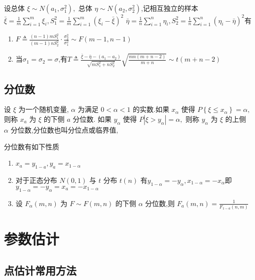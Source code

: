 \documentclass[10pt]{yerbaformat}
\begin{document}
\begin{theorem}
    设总体 $\xi \sim N\left(a_{1}, \sigma_{1}^{2}\right),$ 总体 $\eta \sim N\left(a_{2}, \sigma_{2}^{2}\right)$,记相互独立的样本$\bar{\xi}=\frac{1}{m} \sum_{i=1}^{m} \xi_{i}, S_{1}^{2}=\frac{1}{m} \sum_{i=1}^{m}\left(\xi_{i}-\bar{\xi}\right)^{2}$
    $\bar{\eta}=\frac{1}{n} \sum_{i=1}^{n} \eta_{i}, S_{2}^{2}=\frac{1}{n} \sum_{i=1}^{n}\left(\eta_{i}-\bar{\eta}\right)^{2}$有
    \begin{enumerate}
        \item $F \triangleq \frac{(n-1) m S_{1}^{2}}{(m-1) n S_{2}^{2}} \cdot \frac{\sigma_{2}^{2}}{\sigma_{1}^{2}} \sim F(m-1, n-1)$
        \item 当$\sigma_{1}=\sigma_{2}=\sigma$,有$T \triangleq \frac{\bar{\xi}-\bar{\eta}-\left(a_{1}-a_{2}\right)}{\sqrt{m S_{1}^{2}+n S_{2}^{2}}} \sqrt{\frac{m n(m+n-2)}{m+n}} \sim t(m+n-2)$
    \end{enumerate}
\end{theorem}


\subsection{分位数}
\begin{definition}
    设 $\xi$ 为一个随机变量, $\alpha$ 为满足 $0<\alpha<1$ 的实数.如果 $x_{\alpha}$ 使得 $P\left\{\xi \leqslant x_{\alpha}\right\}=\alpha,$ 则称 $x_{a}$ 为 $\xi$ 的下侧 $a$ 分位数. 如果 $y_{\alpha}$ 使得 $P\left|\xi>y_{\alpha}\right|=\alpha,$ 则称 $y_{\alpha}$ 为 $\xi$ 的上侧 $\alpha$ 分位数,分位数也叫分位点或临界值,
\end{definition}
\par 分位数有如下性质
\begin{enumerate}
    \item $x_{a}=y_{1-a}, y_{a}=x_{1-\alpha}$
    \item 对于正态分布 $N(0,1)$ 与 $t$ 分布 $t(n)$ 有$y_{1-\alpha}=-y_{\alpha}, x_{1-\alpha}=-x_{\alpha}
          $即$y_{1-\alpha}=-y_{\alpha}=x_{a}=-x_{1-\alpha}$
    \item 设 $F_{\alpha}(m, n)$ 为 $F \sim F(m, n)$ 的下侧 $\alpha$ 分位数,则 $F_{a}(m, n)=\frac{1}{F_{1-a}(n, m)}$
\end{enumerate}

\section{参数估计}

\subsection{点估计常用方法}
\end{document}
